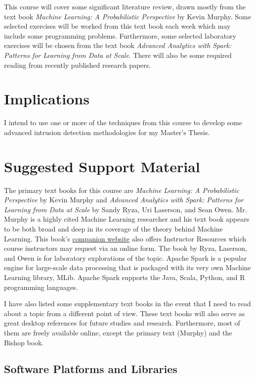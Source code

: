 \documentclass[12pt]{article}
\begin{document}
This course will cover some significant literature review, drawn mostly from the text book \textit{Machine Learning: A
Probabilistic Perspective} by Kevin Murphy.  Some selected exercises will be worked from this text book each week which may
include some programming problems. Furthermore, some selected laboratory exercises will be chosen from the text book
\textit{Advanced Analytics with Spark: Patterns for Learning from Data at Scale}. There will also be some required reading from
recently published research papers.

\section{Implications}

I intend to use one or more of the techniques from this course to develop some advanced intrusion detection methodologies for my
Master's Thesis.

\section{Suggested Support Material}

The primary text books for this course are \textit{Machine Learning: A Probabilistic Perspective} by Kevin Murphy and
\textit{Advanced Analytics with Spark: Patterns for Learning from Data at Scale} by Sandy Ryza, Uri Laserson, and Sean Owen.
Mr. Murphy is a highly cited Machine Learning researcher and his text book appears to be both broad and deep in its
coverage of the theory behind Machine Learning. This book's \href{https://mitpress.mit.edu/books/machine-learning-0}{companion website}
also offers Instructor Resources which course instructors may request via an online form. The book by Ryza, Laserson, and Owen
is for laboratory explorations of the topic. Apache Spark is a popular engine for large-scale data processing that is packaged
with its very own Machine Learning library, MLib. Apache Spark supports the Java, Scala, Python, and R programming languages.

I have also listed some supplementary text books in the event that I need to read about a topic from a different point
of view. These text books will also serve as great desktop references for future studies and research. Furthermore, most of them
are freely available online, except the primary text (Murphy) and the Bishop book.

\subsection{Software Platforms and Libraries}
\end{document}

